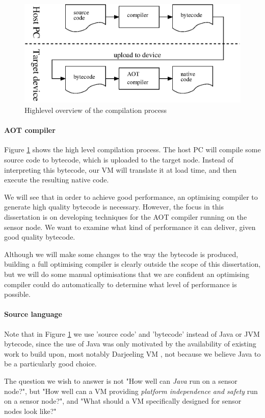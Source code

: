 \begin{figure}[]
  \centering
  \includegraphics[width=0.6\linewidth]{compilation-process-highlevel.eps}
  \caption{Highlevel overview of the compilation process}
  \label{fig-compilation-process-highlevel}
\end{figure}

\paragraph{AOT compiler}
Figure \ref{fig-compilation-process-highlevel} shows the high level compilation process. The host PC will compile some source code to bytecode, which is uploaded to the target node. Instead of interpreting this bytecode, our VM will translate it at load time, and then execute the resulting native code.

We will see that in order to achieve good performance, an optimising compiler to generate high quality bytecode is necessary. However, the focus in this dissertation is on developing techniques for the AOT compiler running on the sensor node. We want to examine what kind of performance it can deliver, given good quality bytecode.

Although we will make some changes to the way the bytecode is produced, building a full optimising compiler is clearly outside the scope of this dissertation, but we will do some manual optimisations that we are confident an optimising compiler could do automatically to determine what level of performance is possible.

\paragraph{Source language}
Note that in Figure \ref{fig-compilation-process-highlevel} we use 'source code' and 'bytecode' instead of Java or JVM bytecode, since the use of Java was only motivated by the availability of existing work to build upon, most notably Darjeeling VM \cite{Brouwers:2009cj}, not because we believe Java to be a particularly good choice.

The question we wish to answer is not "How well can \emph{Java} run on a sensor node?", but "How well can a VM providing \emph{platform independence and safety} run on a sensor node?", and "What should a VM specifically designed for sensor nodes look like?"

